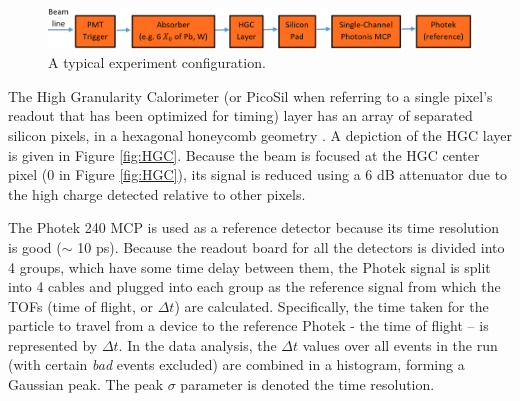\documentclass[12pt]{article}
\begin{document}
\begin{figure}
	\centering
	\includegraphics[width=\linewidth]{setup.png}
	\caption{A typical experiment configuration.}
	\label{fig:setup}
\end{figure}

The High Granularity Calorimeter (or PicoSil when referring to a single pixel’s readout that has been optimized for timing) layer has an array of separated silicon pixels, in a hexagonal honeycomb geometry \cite{P2}. 
A depiction of the HGC layer is given in Figure \ref{fig:HGC}. 
Because the beam is focused at the HGC center pixel (0 in Figure \ref{fig:HGC}), its signal is reduced using a 6 dB attenuator due to the high charge detected relative to other pixels. 

The Photek 240 MCP is used as a reference detector because its time resolution is good ($\sim$ 10 ps). 
Because the readout board for all the detectors is divided into 4 groups, which have some time delay between them, the Photek signal is split into 4 cables and plugged into each group as the reference signal from which the TOFs (time of flight, or $\Delta t$) are calculated. 
Specifically, the time taken for the particle to travel from a device to the reference Photek - the time of flight – is represented by $\Delta t$. 
In the data analysis, the $\Delta t$ values over all events in the run (with certain \textit{bad} events excluded) are combined in a histogram, forming a Gaussian peak. 
The peak $\sigma$ parameter is denoted the time resolution.
\end{document}
